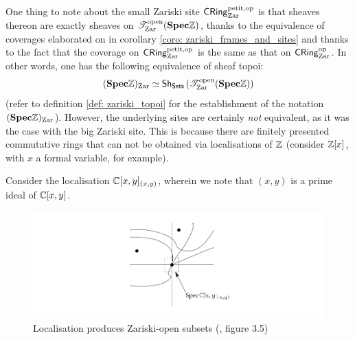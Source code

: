 \begin{remark}
                        One thing to note about the small Zariski site $\mathsf{CRing}^{\mathrm{petit}, \mathrm{op}}_{\mathrm{Zar}}$ is that sheaves thereon are exactly sheaves on $\mathscr{T}^{\mathrm{open}}_{\mathrm{Zar}}(\mathbf{Spec} \mathbb{Z})$, thanks to the equivalence of coverages elaborated on in corollary \ref{coro: zariski_frames_and_sites} and thanks to the fact that the coverage on $\mathsf{CRing}^{\mathrm{petit}, \mathrm{op}}_{\mathrm{Zar}}$ is the same as that on $\mathsf{CRing}^{\mathrm{op}}_{\mathrm{Zar}}$. In other words, one has the following equivalence of sheaf topoi:
                            $$(\mathbf{Spec} \mathbb{Z})_{\mathrm{Zar}} \simeq \mathsf{Sh}_{\mathsf{Sets}}\left(\mathscr{T}^{\mathrm{open}}_{\mathrm{Zar}}(\mathbf{Spec} \mathbb{Z})\right)$$
                        (refer to definition \ref{def: zariski_topoi} for the establishment of the notation $(\mathbf{Spec} \mathbb{Z})_{\mathrm{Zar}}$). However, the underlying sites are certainly \textit{not} equivalent, as it was the case with the big Zariski site. This is because there are finitely presented commutative rings that can not be obtained via localisations of $\mathbb{Z}$ (consider $\mathbb{Z}[x]$, with $x$ a formal variable, for example). 
                    \end{remark}
                    \begin{example}
                        Consider the localisation $\mathbb{C}[x, y]_{(x, y)}$, wherein we note that $(x, y)$ is a prime ideal of $\mathbb{C}[x,y]$. 
                            \begin{figure}[H]
                                \centering
                                \includegraphics[width=\linewidth,height=\textheight,keepaspectratio]{Figures/localisation.png}
                                \caption{Localisation produces Zariski-open subsets (\cite{risingsea}, figure 3.5)}
                                \label{fig: zariski_open_via_localisation}
                            \end{figure}
                    \end{example}
                    
